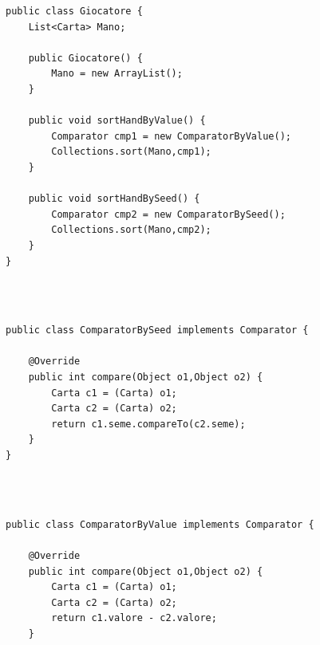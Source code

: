 \documentclass[10pt,a4paper]{book}
\begin{document}
\begin{verbatim}
public class Giocatore {
    List<Carta> Mano;
    
    public Giocatore() {
        Mano = new ArrayList();
    }

    public void sortHandByValue() {
        Comparator cmp1 = new ComparatorByValue();
        Collections.sort(Mano,cmp1);
    }
    
    public void sortHandBySeed() {
        Comparator cmp2 = new ComparatorBySeed();
        Collections.sort(Mano,cmp2);
    }
}

\end{verbatim}
\\\\
\begin{verbatim}
public class ComparatorBySeed implements Comparator {
    
    @Override
    public int compare(Object o1,Object o2) {
        Carta c1 = (Carta) o1;
        Carta c2 = (Carta) o2;
        return c1.seme.compareTo(c2.seme);
    }
}

\end{verbatim}
\\\\
\begin{verbatim}
public class ComparatorByValue implements Comparator {
    
    @Override
    public int compare(Object o1,Object o2) {
        Carta c1 = (Carta) o1;
        Carta c2 = (Carta) o2;
        return c1.valore - c2.valore;
    } 

\end{verbatim}
\newpage
\end{document}
